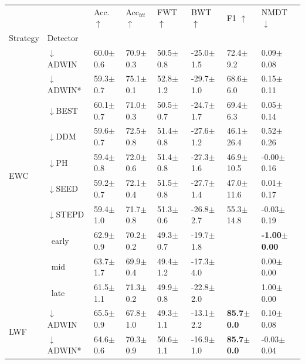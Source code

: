 \begin{tabular}{llllllll}
\toprule
 &  & Acc. $\uparrow$ & Acc$_{ttt}$ $\uparrow$ & FWT $\uparrow$ & BWT $\uparrow$ & F1 $\uparrow$ & NMDT $\downarrow$ \\
Strategy & Detector &  &  &  &  &  &  \\
\midrule
\multirow[t]{10}{*}{EWC} & $\downarrow$ADWIN & 60.0\tiny{$\pm$0.6} & 70.9\tiny{$\pm$0.3} & 50.5\tiny{$\pm$0.8} & -25.0\tiny{$\pm$1.5} & 72.4\tiny{$\pm$9.2} & 0.09\tiny{$\pm$0.08} \\
 & $\downarrow$ADWIN* & 59.3\tiny{$\pm$0.7} & 75.1\tiny{$\pm$0.1} & 52.8\tiny{$\pm$1.2} & -29.7\tiny{$\pm$1.0} & 68.6\tiny{$\pm$6.0} & 0.15\tiny{$\pm$0.11} \\
 & $\downarrow$BEST & 60.1\tiny{$\pm$0.7} & 71.0\tiny{$\pm$0.3} & 50.5\tiny{$\pm$0.7} & -24.7\tiny{$\pm$1.7} & 69.4\tiny{$\pm$6.3} & 0.05\tiny{$\pm$0.14} \\
 & $\downarrow$DDM & 59.6\tiny{$\pm$0.7} & 72.5\tiny{$\pm$0.8} & 51.4\tiny{$\pm$0.8} & -27.6\tiny{$\pm$1.2} & 46.1\tiny{$\pm$26.4} & 0.52\tiny{$\pm$0.26} \\
 & $\downarrow$PH & 59.4\tiny{$\pm$0.8} & 72.0\tiny{$\pm$0.6} & 51.4\tiny{$\pm$0.8} & -27.3\tiny{$\pm$1.6} & 46.9\tiny{$\pm$10.5} & -0.00\tiny{$\pm$0.16} \\
 & $\downarrow$SEED & 59.2\tiny{$\pm$0.7} & 72.1\tiny{$\pm$0.4} & 51.5\tiny{$\pm$0.8} & -27.7\tiny{$\pm$1.4} & 47.0\tiny{$\pm$11.6} & 0.01\tiny{$\pm$0.17} \\
 & $\downarrow$STEPD & 59.4\tiny{$\pm$1.0} & 71.7\tiny{$\pm$0.8} & 51.3\tiny{$\pm$0.6} & -26.8\tiny{$\pm$2.7} & 55.3\tiny{$\pm$14.8} & -0.03\tiny{$\pm$0.19} \\
 & $\ \;$early & 62.9\tiny{$\pm$0.9} & 70.2\tiny{$\pm$0.2} & 49.3\tiny{$\pm$0.7} & -19.7\tiny{$\pm$1.8} &  & \textbf{-1.00\tiny{$\pm$0.00}} \\
 & $\ \;$mid & 63.7\tiny{$\pm$1.7} & 69.9\tiny{$\pm$0.4} & 49.4\tiny{$\pm$1.2} & -17.3\tiny{$\pm$4.0} &  & 0.00\tiny{$\pm$0.00} \\
 & $\ \;$late & 61.5\tiny{$\pm$1.1} & 71.3\tiny{$\pm$0.2} & 49.9\tiny{$\pm$0.8} & -22.8\tiny{$\pm$2.0} &  & 1.00\tiny{$\pm$0.00} \\
\midrule
\multirow[t]{10}{*}{LWF} & $\downarrow$ADWIN & 65.5\tiny{$\pm$0.9} & 67.8\tiny{$\pm$1.0} & 49.3\tiny{$\pm$1.1} & -13.1\tiny{$\pm$2.2} & \textbf{85.7\tiny{$\pm$0.0}} & 0.10\tiny{$\pm$0.08} \\
 & $\downarrow$ADWIN* & 64.6\tiny{$\pm$0.6} & 70.3\tiny{$\pm$0.9} & 50.6\tiny{$\pm$1.1} & -16.9\tiny{$\pm$1.0} & \textbf{85.7\tiny{$\pm$0.0}} & -0.03\tiny{$\pm$0.04} \\

\end{tabular}
